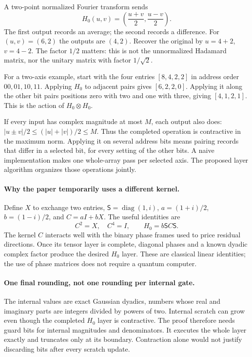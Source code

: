 
A two-point normalized Fourier transform sends
\[
 H_0(u,v)=\left(\frac{u+v}{2},\frac{u-v}{2}\right).
\]
The first output records an average; the second records a difference.
For $(u,v)=(6,2)$ the outputs are $(4,2)$. Recover the original by
$u=4+2$, $v=4-2$. The factor $1/2$ matters: this is not the unnormalized
Hadamard matrix, nor the unitary matrix with factor $1/\sqrt2$.


For a two-axis example, start with the four entries $[8,4,2,2]$ in address
order $00,01,10,11$. Applying $H_0$ to adjacent pairs gives $[6,2,2,0]$.
Applying it along the other bit pairs positions zero with two and one with
three, giving $[4,1,2,1]$. This is the action of $H_0\otimes H_0$.

If every input has complex magnitude at most $M$, each output also does:
$|u\pm v|/2\le(|u|+|v|)/2\le M$. Thus the completed operation is
contractive in the maximum norm. Applying it on several address bits means
pairing records that differ in a selected bit, for every setting of the other
bits. A naive implementation makes one whole-array pass per selected axis.
The proposed layer algorithm organizes those operations jointly.

\paragraph{Why the paper temporarily uses a different kernel.}
Define $X$ to exchange two entries, $\mathsf S=\operatorname{diag}(1,i)$,
$a=(1+i)/2$, $b=(1-i)/2$, and $C=aI+bX$. The useful identities are
\[
 C^2=X,\quad C^4=I,\qquad H_0=b\mathsf S C\mathsf S.
\]
The kernel $C$ interacts well with the binary phase frames used to price
residual directions. Once its tensor layer is complete, diagonal phases and
a known dyadic complex factor produce the desired $H_0$ layer. These are
classical linear identities; the use of phase matrices does not require a
quantum computer.

\paragraph{One final rounding, not one rounding per internal gate.}
The internal values are exact Gaussian dyadics, numbers whose real and
imaginary parts are integers divided by powers of two. Internal scratch can
grow even though the completed $H_0$ layer is contractive. The proof therefore
needs guard bits for internal magnitudes and denominators. It executes the
whole layer exactly and truncates only at its boundary. Contraction alone
would not justify discarding bits after every scratch update.

